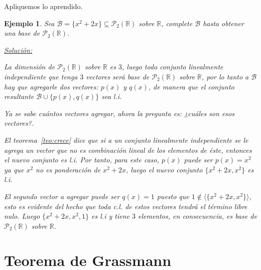 \documentclass[12pt]{book}
\newtheorem{ejem}{Ejemplo}
\def\R{\mathbb{R}}
\def\P{\mathcal{P}}
\def\B{\mathcal{B}}
\begin{document}
Apliquemos lo aprendido.

\begin{ejem}
Sea $\B=\{x^2+2x\}\subseteq\P_2(\R)$ sobre $\R$, complete $\B$ hasta obtener una base de $\P_2(\R)$.

\underline{Soluci\'on:}
{\em
La dimensi\'on de $\P_2(\R)$ sobre $\R$ es $3$, luego todo conjunto linealmente independiente que tenga $3$ vectores ser\'a base de $\P_2(\R)$ sobre $\R$, por lo tanto a $\B$ hay que agregarle dos vectores: $p(x)$ y $q(x)$, de manera que el conjunto resultante $\B\cup \{p(x),q(x)\}$ sea l.i.

Ya se sabe cu\'antos vectores agregar, ahora la pregunta es: ¿cuáles son esos vectores?.

El teorema~\ref{teo:crece} dice que si a un conjunto linealmente independiente se le agrega un vector que no es combinaci\'on lineal de los elementos de éste, entonces el nuevo conjunto es l.i.
Por tanto, para este caso, $p(x)$ puede ser $p(x)=x^2$ ya que $x^2$ no es ponderación de $x^2+2x$, luego el nuevo conjunto $\{x^2+2x, x^2\}$ es l.i. 

El segundo vector a agregar puede ser $q(x)=1$ puesto que $1\not\in\langle\{x^2+2x, x^2\}\rangle$, esto es evidente del hecho que toda c.l. de estos vectores tendrá el término libre nulo.
Luego $\{x^2+2x, x^2,1\}$ es l.i y tiene $3$ elementos, en consecuencia, es base de $\P_2(\R)$ sobre $\R$.
}
\end{ejem}

\section{Teorema de Grassmann}
\end{document}
